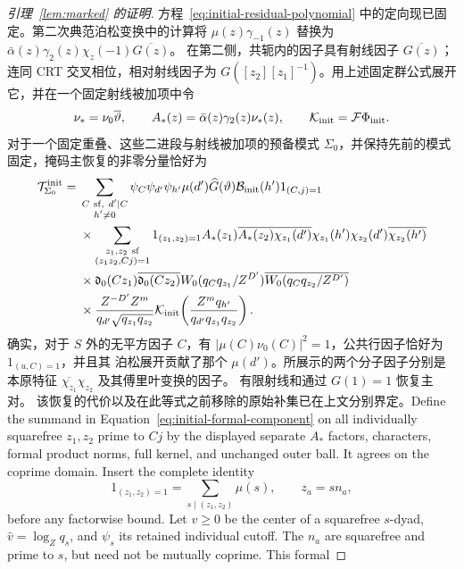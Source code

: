 \documentclass[11pt,a4paper]{article}
\numberwithin{equation}{section}
\numberwithin{figure}{section}
\theoremstyle{definition}
\theoremstyle{remark}
\begin{document}
\begin{proof}[引理~\ref{lem:marked} 的证明]
方程~\eqref{eq:initial-residual-polynomial} 中的定向现已固定。第二次典范泊松变换中的计算将 \(\mu(z)\gamma_{-1}(z)\) 替换为
\(\bar\alpha(z)\gamma_2(z)\chi_z(-1)\overline{G(z)}\)。
在第二侧，共轭内的因子具有射线因子
\(\overline{G(z)}\)；连同 CRT 交叉相位，相对射线因子为 \(G([z_2][z_1]^{-1})\)。用上述固定群公式展开它，并在一个固定射线被加项中令
\[
 \nu_*=\nu_0\overline\vartheta,\qquad
 A_*(z)=\bar\alpha(z)\gamma_2(z)\nu_*(z),\qquad
 \mathcal K_{\rm init}=\mathcal F\Phi_{\rm init}.
\]
对于一个固定重叠、这些二进段与射线被加项的预备模式 \(\Sigma_0\)，并保持先前的模式固定，掩码主恢复的非零分量恰好为
\begin{equation}\label{eq:initial-formal-component}
 \begin{split}
 \mathcal T^{\rm init}_{\Sigma_0}={}&
 \sum_{\substack{C\ {\rm sf},\ d'\mid C\\h'\ne0}}
 \psi_C\psi_{d'}\psi_{h'}\mu(d')\widehat G(\vartheta)
 \mathcal B_{\rm init}(h')1_{(C,j)=1}\\
 &\times\sum_{\substack{z_1,z_2\ {\rm sf}\\(z_1z_2,Cj)=1}}
 1_{(z_1,z_2)=1}
 A_*(z_1)\overline{A_*(z_2)}
 \overline{\chi_{z_1}(d')}\chi_{z_1}(h')
 \chi_{z_2}(d')\overline{\chi_{z_2}(h')}\\
 &\times\mathfrak d_0(Cz_1)\overline{\mathfrak d_0(Cz_2)}
 W_0(q_Cq_{z_1}/Z^{D'})\overline{W_0(q_Cq_{z_2}/Z^{D'})}\\
 &\times\frac{Z^{-D'}Z^m}{q_{d'}\sqrt{q_{z_1}q_{z_2}}}
 \mathcal K_{\rm init}\!\left(
       \frac{Z^mq_{h'}}{q_{d'}q_{z_1}q_{z_2}}\right).
 \end{split}
\end{equation}
确实，对于 \(S\) 外的无平方因子 \(C\)，有 \(|\mu(C)\nu_0(C)|^2=1\)，公共行因子恰好为 \(1_{(u,C)=1}\)，并且其
泊松展开贡献了那个 \(\mu(d')\)。所展示的两个分子因子分别是本原特征
\(\overline{\chi_{z_1}}\chi_{z_2}\) 及其傅里叶变换的因子。
有限射线和通过 \(G(1)=1\) 恢复主对。
该恢复的代价以及在此等式之前移除的原始补集已在上文分别界定。Define the summand in Equation~\eqref{eq:initial-formal-component}
on all individually squarefree \(z_1,z_2\) prime to \(Cj\) by the
displayed separate \(A_*\) factors, characters, formal product norms,
full kernel, and unchanged outer ball.  It agrees on the coprime
domain.  Insert the complete identity
\[
 1_{(z_1,z_2)=1}=\sum_{s\mid(z_1,z_2)}\mu(s),\qquad z_a=sn_a,
\]
before any factorwise bound.  Let \(v\ge0\) be the center of a
squarefree \(s\)-dyad, \(\widehat v=\log_Zq_s\), and \(\psi_s\)
its retained individual cutoff.  The \(n_a\) are squarefree and
prime to \(s\), but need not be mutually coprime.  This formal

\end{proof}
\end{document}
